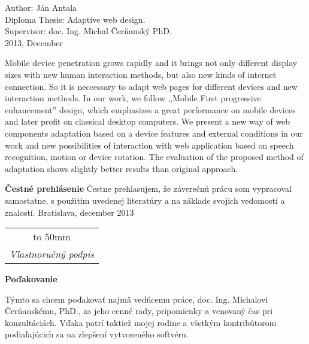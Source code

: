 Author: Ján Antala\\
Diploma Thesis: Adaptive web design. \\
Supervisor: doc. Ing. Michal Čerňanský PhD. \\
2013, December
\newline

Mobile device penetration grows rapidly and it brings not only different display sizes with new human interaction methods, but also new kinds of internet connection. So it is neccessary to adapt web pages for different devices and new interaction methods.
In our work, we follow ,,Mobile First progressive enhancement'' design, which emphasizes a great performance on mobile devices and later profit on classical desktop computers. We present a new way of web components adaptation based on a device features and external conditions in our work and new possibilities of interaction with web application based on speech recognition, motion or device rotation.
The evaluation of the proposed method of adaptation shows slightly better results than original approach.


\pagebreak
\thispagestyle{empty}
\bigskip\vfil
 \noindent\textbf{Čestné prehlásenie}
\newline\newline
Čestne prehlasujem, že záverečnú prácu som vypracoval samostatne, s použitím uvedenej
literatúry a na základe svojich vedomostí a znalostí.
\newline\newline
\noindent Bratislava, december 2013 \hfil
\begin{tabular}[t]{c}
\hbox to 50mm {\dotfill} \\ \textit{\small Vlastnoručný podpis}
\end{tabular}\qquad\linebreak

\pagebreak
\thispagestyle{empty}
\bigskip\vfil
 \noindent\textbf{Poďakovanie}
\bigskip

Týmto sa chcem poďakovať najmä vedúcemu práce, doc. Ing. Michalovi Čerňanskému, PhD.,
za jeho cenné rady, pripomienky a venovaný čas pri konzultáciách. Vďaka patrí taktiež mojej rodine a všetkým kontribútorom podiaľajúcich sa na zlepšení vytvoreného softvéru.
\pagebreak

\newpage
\setcounter{page}{1}
\thispagestyle{empty}
\setcounter{tocdepth}{3}
\tableofcontents %
\newpage 
\thispagestyle{empty}
\listoftables
\newpage
\thispagestyle{empty}
\listoffigures 
\newpage